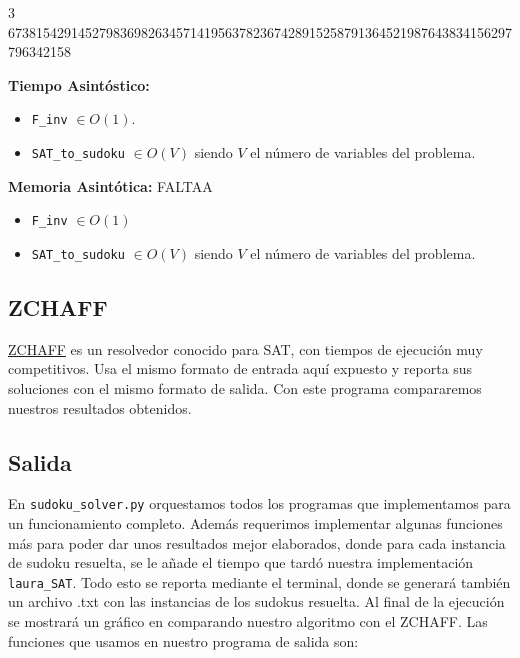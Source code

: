 \documentclass[letterpaper,12pt]{article}
\begin{document}
\footnotesize{3 673815429145279836982634571419563782367428915258791364521987643834156297796342158}\\
\normalsize

\textbf{Tiempo Asintóstico:}
\begin{itemize}
	\item \texttt{F\_inv} $\in O(1)$.
	\item \texttt{SAT\_to\_sudoku} $\in O(V)$ siendo $V$ el número de variables del problema.\\
\end{itemize}


\textbf{Memoria Asintótica:} FALTAA
\begin{itemize}
	\item \texttt{F\_inv} $\in O(1)$
	\item \texttt{SAT\_to\_sudoku} $\in O(V)$ siendo $V$ el número de variables del problema.\\
\end{itemize}

\subsection{ZCHAFF}

\href{https://www.princeton.edu/~chaff/zchaff.html}{ZCHAFF} es un resolvedor conocido para SAT, con tiempos de ejecución muy competitivos. Usa el mismo formato de entrada aquí expuesto y reporta sus soluciones con el mismo formato de salida. Con este programa compararemos nuestros resultados obtenidos.

\subsection{Salida}

En \texttt{sudoku\_solver.py} orquestamos todos los programas que implementamos para un funcionamiento completo. Además requerimos implementar algunas funciones más para poder dar unos resultados mejor elaborados, donde para cada instancia de sudoku resuelta, se le añade el tiempo que tardó nuestra implementación \texttt{laura\_SAT}. Todo esto se reporta mediante el terminal, donde se generará también un archivo .txt con las instancias de los sudokus resuelta. Al final de la ejecución se mostrará un gráfico en comparando nuestro algoritmo con el ZCHAFF. Las funciones que usamos en nuestro programa de salida son:\\
\end{document}
